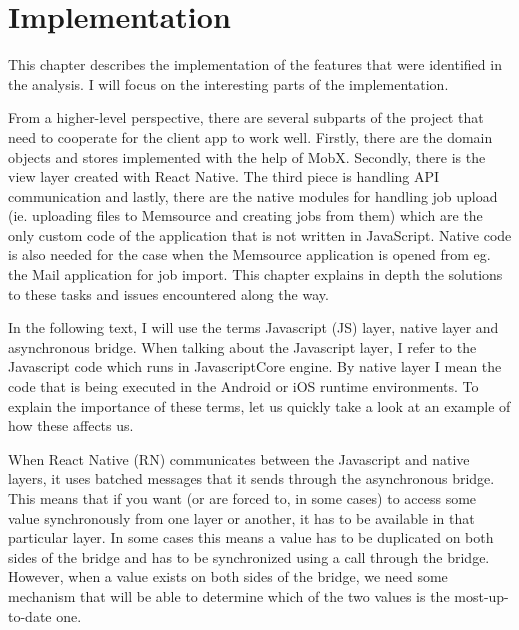 \chapter{Implementation}

This chapter describes the implementation of the features that were identified in the analysis. I will focus on the interesting parts of the implementation.

From a higher-level perspective, there are several subparts of the project that need to cooperate for the client app to work well. Firstly, there are the domain objects and stores implemented with the help of MobX. Secondly, there is the view layer created with React Native. The third piece is handling API communication and lastly, there are the native modules for handling job upload (ie. uploading files to Memsource and creating jobs from them) which are the only custom code of the application that is not written in JavaScript. Native code is also needed for the case when the Memsource application is opened from eg. the Mail application for job import. This chapter explains in depth the solutions to these tasks and issues encountered along the way.


In the following text, I will use the terms Javascript (JS) layer, native layer and asynchronous bridge. When talking about the Javascript layer, I refer to the Javascript code which runs in JavascriptCore engine. By native layer I mean the code that is being executed in the Android or iOS runtime environments. To explain the importance of these terms, let us quickly take a look at an example of how these affects us.

When React Native (RN) communicates between the Javascript and native layers, it uses batched messages that it sends through the asynchronous bridge. This means that if you want (or are forced to, in some cases) to access some value synchronously from one layer or another, it has to be available in that particular layer. In some cases this means a value has to be duplicated on both sides of the bridge and has to be synchronized using a call through the bridge. However, when a value exists on both sides of the bridge, we need some mechanism that will be able to determine which of the two values is the most-up-to-date one. 

